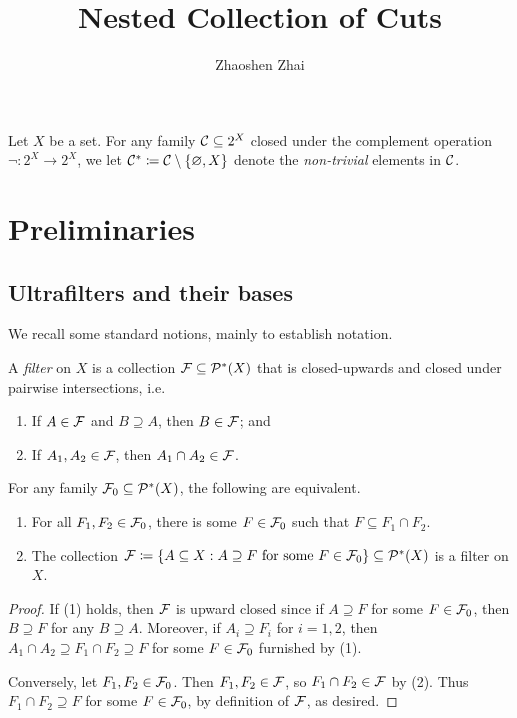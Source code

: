 \documentclass{amsart}
\begin{document}
    \title{Nested Collection of Cuts}
    \author{Zhaoshen Zhai}
    \maketitle

    \begin{notation}
        Let $X$ be a set. For any family $\mathcal{C}\subseteq2^X$ closed under the complement operation $\lnot:2^X\to2^X$, we let $\mathcal{C}^\ast\coloneqq\mathcal{C}\setminus\left\{\varnothing,X\right\}$ denote the \textit{non-trivial} elements in $\mathcal{C}$.
    \end{notation}

    \section{Preliminaries}

    \subsection{Ultrafilters and their bases}

    We recall some standard notions, mainly to establish notation.

    \begin{definition}
        A \textit{filter} on $X$ is a collection $\mathcal{F}\subseteq\mathcal{P}^\ast(X)$ that is closed-upwards and closed under pairwise intersections, i.e.
        \begin{enumerate}
            \item If $A\in\mathcal{F}$ and $B\supseteq A$, then $B\in\mathcal{F}$; and
            \item If $A_1,A_2\in\mathcal{F}$, then $A_1\cap A_2\in\mathcal{F}$.
        \end{enumerate}
    \end{definition}

    \begin{lemma}
        For any family $\mathcal{F}_0\subseteq\mathcal{P}^\ast(X)$, the following are equivalent.
        \begin{enumerate}
            \item For all $F_1,F_2\in\mathcal{F}_0$, there is some $F\in\mathcal{F}_0$ such that $F\subseteq F_1\cap F_2$.
            \item The collection $\mathcal{F}\coloneqq\left\{A\subseteq X: A\supseteq F\textrm{ for some }F\in\mathcal{F}_0\right\}\subseteq\mathcal{P}^\ast(X)$ is a filter on $X$.
        \end{enumerate}
    \end{lemma}
    \begin{proof}
        If (1) holds, then $\mathcal{F}$ is upward closed since if $A\supseteq F$ for some $F\in\mathcal{F}_0$, then $B\supseteq F$ for any $B\supseteq A$. Moreover, if $A_i\supseteq F_i$ for $i=1,2$, then $A_1\cap A_2\supseteq F_1\cap F_2\supseteq F$ for some $F\in\mathcal{F}_0$ furnished by (1).

        Conversely, let $F_1,F_2\in\mathcal{F}_0$. Then $F_1,F_2\in\mathcal{F}$, so $F_1\cap F_2\in\mathcal{F}$ by (2). Thus $F_1\cap F_2\supseteq F$ for some $F\in\mathcal{F}_0$, by definition of $\mathcal{F}$, as desired.
    \end{proof}
\end{document}
